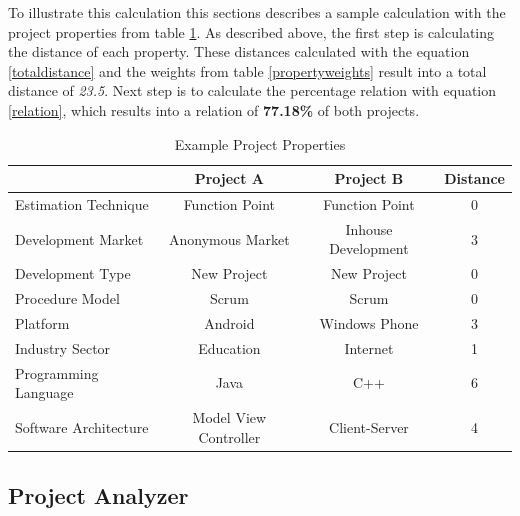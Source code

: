 To illustrate this calculation this sections describes a sample calculation with the project properties from table \ref{exampleproperty}. As described above, the first step is calculating the distance of each property. These distances calculated with the equation \ref{totaldistance} and the weights from table \ref{propertyweights} result into a total distance of \textit{23.5}. Next step is to calculate the percentage relation with equation \ref{relation}, which results into a relation of \textbf{77.18\%} of both projects.
\begin{table}[h]
	\centering 
	\setlength{\tabcolsep}{4pt}
	\begin{tabular}{|l|c|c|c|}\hline
		\phantom{abc}	& \textbf{Project A}	& \textbf{Project B} 	& \textbf{Distance}\\ \hline
		Estimation Technique   	& Function Point  & Function Point   & 0 	\\ \hline
		Development Market   	& Anonymous Market & Inhouse Development &3     	\\ \hline
		Development Type   		& New Project & New Project    	& 0\\ \hline
		Procedure Model   		& Scrum  & Scrum    	& 0\\ \hline
		Platform   				& Android & Windows Phone  &3   	\\ \hline
		Industry Sector   		& Education  & Internet     &1	\\ \hline
		Programming Language   	& Java  & C++    	&6\\ \hline
		Software Architecture   & Model View Controller  & Client-Server    	&4\\ \hline
	\end{tabular} 
	\caption{Example Project Properties} 
	\label{exampleproperty} 
\end{table}\newpage

\subsection{Project Analyzer}

